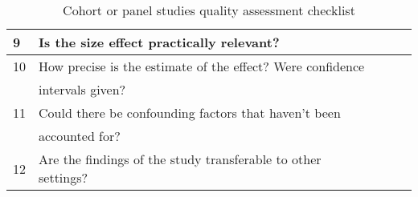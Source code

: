 \begin{table}[H]
\begin{center}
{\begin{tabular}{|l||l|l|l|l|}
                        \hline  
                        9  & Is the size effect practically relevant?                         &&& \\
                        \hline  
                        10 & How precise is the estimate of the effect? Were confidence       &&& \\
                           & intervals given?                                                 &&& \\
                        \hline  
                        11 & Could there be confounding factors that haven’t been             &&& \\
                           & accounted for?                                                   &&& \\
                        \hline
                        12 & Are the findings of the study transferable to other settings?    &&& \\
                        \hline
                \end{tabular}}
        \end{center}
        \caption{Cohort or panel studies quality assessment checklist}
        \label{table:cohortStudy}
\end{table}


